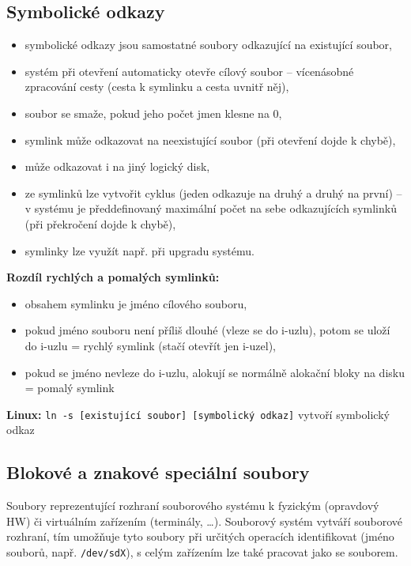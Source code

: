 \documentclass[a4paper, 11pt]{article}
\newcommand{\tcmd}[1]{\texttt{#1}}
\begin{document}
\subsection{Symbolické odkazy}
\begin{itemize}
    \item symbolické odkazy jsou samostatné soubory odkazující na existující soubor,
    \item systém při otevření automaticky otevře cílový soubor -- vícenásobné zpracování cesty (cesta k symlinku a cesta uvnitř něj),
    \item soubor se smaže, pokud jeho počet jmen klesne na 0,
    \item symlink může odkazovat na neexistující soubor (při otevření dojde k chybě),
    \item může odkazovat i na jiný logický disk,
    \item ze symlinků lze vytvořit cyklus (jeden odkazuje na druhý a druhý na první) -- v systému je předdefinovaný maximální počet na sebe odkazujících symlinků (při překročení dojde k chybě),
    \item symlinky lze využít např. při upgradu systému.
\end{itemize}
 
\textbf{Rozdíl rychlých a pomalých symlinků:}
\begin{itemize}
    \item obsahem symlinku je jméno cílového souboru,
    \item pokud jméno souboru není příliš dlouhé (vleze se do i-uzlu), potom se uloží do i-uzlu = rychlý symlink (stačí otevřít jen i-uzel),
    \item pokud se jméno nevleze do i-uzlu, alokují se normálně alokační bloky na disku = pomalý symlink
\end{itemize}
 
\textbf{Linux:}
\tcmd{ln -s [existující soubor] [symbolický odkaz]} vytvoří symbolický odkaz
 
\subsection{Blokové a znakové speciální soubory} \label{blok-char-hw}
Soubory reprezentující rozhraní souborového systému k fyzickým (opravdový HW) či virtuálním zařízením (terminály, \ldots). Souborový systém vytváří souborové rozhraní, tím umožňuje tyto soubory při určitých operacích identifikovat (jméno souborů, např. \tcmd{/dev/sdX}), s celým zařízením lze také pracovat jako se souborem.
 
\end{document}

